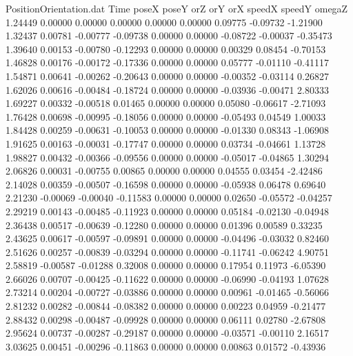 \begin{filecontents}{PositionOrientation.dat}
Time poseX poseY orZ orY orX speedX speedY omegaZ
   1.24449    0.00000    0.00000     0.00000    0.00000    0.00000    0.09775   -0.09732   -1.21900
   1.32437    0.00781   -0.00777    -0.09738    0.00000    0.00000   -0.08722   -0.00037   -0.35473
   1.39640    0.00153   -0.00780    -0.12293    0.00000    0.00000    0.00329    0.08454   -0.70153
   1.46828    0.00176   -0.00172    -0.17336    0.00000    0.00000    0.05777   -0.01110   -0.41117
   1.54871    0.00641   -0.00262    -0.20643    0.00000    0.00000   -0.00352   -0.03114    0.26827
   1.62026    0.00616   -0.00484    -0.18724    0.00000    0.00000   -0.03936   -0.00471    2.80333
   1.69227    0.00332   -0.00518     0.01465    0.00000    0.00000    0.05080   -0.06617   -2.71093
   1.76428    0.00698   -0.00995    -0.18056    0.00000    0.00000   -0.05493    0.04549    1.00033
   1.84428    0.00259   -0.00631    -0.10053    0.00000    0.00000   -0.01330    0.08343   -1.06908
   1.91625    0.00163   -0.00031    -0.17747    0.00000    0.00000    0.03734   -0.04661    1.13728
   1.98827    0.00432   -0.00366    -0.09556    0.00000    0.00000   -0.05017   -0.04865    1.30294
   2.06826    0.00031   -0.00755     0.00865    0.00000    0.00000    0.04555    0.03454   -2.42486
   2.14028    0.00359   -0.00507    -0.16598    0.00000    0.00000   -0.05938    0.06478    0.69640
   2.21230   -0.00069   -0.00040    -0.11583    0.00000    0.00000    0.02650   -0.05572   -0.04257
   2.29219    0.00143   -0.00485    -0.11923    0.00000    0.00000    0.05184   -0.02130   -0.04948
   2.36438    0.00517   -0.00639    -0.12280    0.00000    0.00000    0.01396    0.00589    0.33235
   2.43625    0.00617   -0.00597    -0.09891    0.00000    0.00000   -0.04496   -0.03032    0.82460
   2.51626    0.00257   -0.00839    -0.03294    0.00000    0.00000   -0.11741   -0.06242    4.90751
   2.58819   -0.00587   -0.01288     0.32008    0.00000    0.00000    0.17954    0.11973   -6.05390
   2.66026    0.00707   -0.00425    -0.11622    0.00000    0.00000   -0.06990   -0.04193    1.07628
   2.73214    0.00204   -0.00727    -0.03886    0.00000    0.00000    0.00961   -0.01465   -0.56066
   2.81232    0.00282   -0.00844    -0.08382    0.00000    0.00000    0.00223    0.04959   -0.21477
   2.88432    0.00298   -0.00487    -0.09928    0.00000    0.00000    0.06111    0.02780   -2.67808
   2.95624    0.00737   -0.00287    -0.29187    0.00000    0.00000   -0.03571   -0.00110    2.16517
   3.03625    0.00451   -0.00296    -0.11863    0.00000    0.00000    0.00863    0.01572   -0.43936

\end{filecontents}

